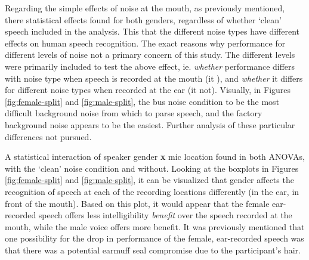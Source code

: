 Regarding the simple effects of noise at the mouth, as previously mentioned, there \DIFdelbegin {}\DIFdelend \DIFaddbegin {}\DIFaddend statistical effects found for both genders, regardless of whether `clean' speech \DIFdelbegin {}\DIFdelend \DIFaddbegin {}\DIFaddend included in the analysis.  This \DIFdelbegin {}\DIFdelend \DIFaddbegin {}\DIFaddend that the different noise types have different effects on human speech recognition.  The exact reasons why performance \DIFdelbegin {}\DIFdelend \DIFaddbegin {}\DIFaddend for different levels of noise \DIFdelbegin {}\DIFdelend \DIFaddbegin {}\DIFaddend not a primary concern of this study.  The different levels were primarily included to test the above effect, ie. \textit{whether} performance differs with noise type when speech is recorded at the mouth (it \DIFdelbegin {}\DIFdelend \DIFaddbegin {}\DIFaddend ), and \textit{whether} it differs for different noise types when recorded at the ear (it \DIFdelbegin {}\DIFdelend \DIFaddbegin {}\DIFaddend not).  Visually, in Figures \ref{fig:female-split} and \ref{fig:male-split}, the bus noise condition \DIFdelbegin {}\DIFdelend \DIFaddbegin {}\DIFaddend to be the most difficult background noise from which to parse speech, and the factory background noise appears to be the easiest.  Further analysis of these particular differences \DIFdelbegin {}\DIFdelend \DIFaddbegin {}\DIFaddend not pursued.



A statistical interaction of speaker gender \textbf{x} mic location \DIFdelbegin {}\DIFdelend \DIFaddbegin {}\DIFaddend found in both ANOVAs, with the `clean' noise condition and without.  
Looking at the boxplots in Figures \ref{fig:female-split} and \ref{fig:male-split}, it can be visualized that gender affects the recognition of speech at each of the recording locations differently (in the ear, in front of the mouth).  Based on this plot, it would appear that the female ear-recorded speech offers less intelligibility \textit{benefit} over the speech recorded at the mouth, while the male voice offers more benefit. It was previously mentioned that one possibility for the drop in performance of the female, ear-recorded speech was that there was a potential earmuff seal compromise due to the participant's hair.  

